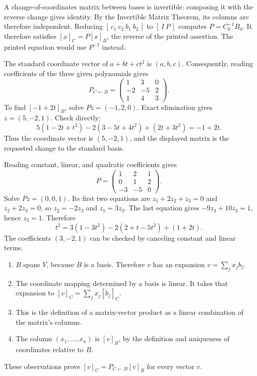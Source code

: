 A change-of-coordinates matrix between bases is invertible: composing it
with the reverse change gives identity. By the Invertible Matrix Theorem,
its columns are therefore independent.
Reducing $[\,c_1\ c_2\ b_1\ b_2\,]$ to $[\,I\ P\,]$ computes
$P=C_0^{-1}B_0$. It therefore satisfies $[x]_C=P[x]_B$, the reverse of
the printed assertion. The printed equation would use $P^{-1}$ instead.

The standard coordinate vector of $a+bt+ct^2$ is $(a,b,c)$.
Consequently, reading coefficients of the three given polynomials gives
\[
 P_{C\leftarrow B}=\begin{pmatrix}1&3&0\\-2&-5&2\\1&4&3\end{pmatrix}.
\]
To find $[-1+2t]_B$, solve $Pz=(-1,2,0)$. Exact elimination gives
$z=(5,-2,1)$. Check directly:
\[
 5(1-2t+t^2)-2(3-5t+4t^2)+(2t+3t^2)=-1+2t.
\]
Thus the coordinate vector is $(5,-2,1)$, and the displayed matrix is the
requested change to the standard basis.

Reading constant, linear, and quadratic coefficients gives
\[
 P=\begin{pmatrix}1&2&1\\0&1&2\\-3&-5&0\end{pmatrix}.
\]
Solve $Pz=(0,0,1)$. Its first two equations are
$z_1+2z_2+z_3=0$ and $z_2+2z_3=0$, so $z_2=-2z_3$ and $z_1=3z_3$.
The last equation gives $-9z_3+10z_3=1$, hence $z_3=1$.
Therefore
\[
 t^2=3(1-3t^2)-2(2+t-5t^2)+(1+2t).
\]
The coefficients $(3,-2,1)$ can be checked by canceling constant and linear terms.

\begin{enumerate}[label=(\alph*)]
\item $B$ spans $V$, because $B$ is a basis. Therefore $v$ has an expansion
$v=\sum_jx_jb_j$.
\item The coordinate mapping determined by a basis is linear. It takes
that expansion to $[v]_C=\sum_jx_j[b_j]_C$.
\item This is the definition of a matrix-vector product as a linear
combination of the matrix's columns.
\item The column $(x_1,\ldots,x_n)$ is $[v]_B$, by the definition and
uniqueness of coordinates relative to $B$.
\end{enumerate}
These observations prove $[v]_C=P_{C\leftarrow B}[v]_B$ for every vector $v$.

